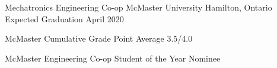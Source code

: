
\begin{cventries}

  \cventry
    {Mechatronics Engineering Co-op} %
    {McMaster University} %
    {Hamilton, Ontario} %
    {Expected Graduation April 2020} %
    {
      \begin{cvitems} %
        \item {McMaster Cumulative Grade Point Average 3.5/4.0}
        \item {McMaster Engineering Co-op Student of the Year Nominee}
      \end{cvitems}
    }



\end{cventries}
